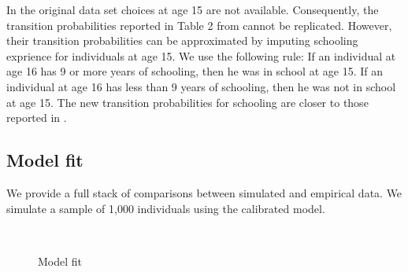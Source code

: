 In the original data set choices at age 15 are not available. Consequently, the transition probabilities reported in Table 2 from \citet{Keane.1997} cannot be replicated. However, their transition probabilities can be approximated by imputing schooling exprience for individuals at age 15. We use the following rule: If an individual at age 16 has 9 or more years of schooling, then he was in school at age 15. If an individual at age 16 has less than 9 years of schooling, then he was not in school at age 15. The new transition probabilities for schooling are closer to those reported in \citet{Keane.1997}.



\newpage
\subsection{Model fit}

We provide a full stack of comparisons between simulated and empirical data. We simulate a sample of 1,000 individuals using the calibrated model.



\begin{figure}[h]\centering
	\caption{Model fit}\label{Model fit appendix}
	\hspace{0.3cm}
	 \\
	\hspace{0.3cm}
\end{figure}


